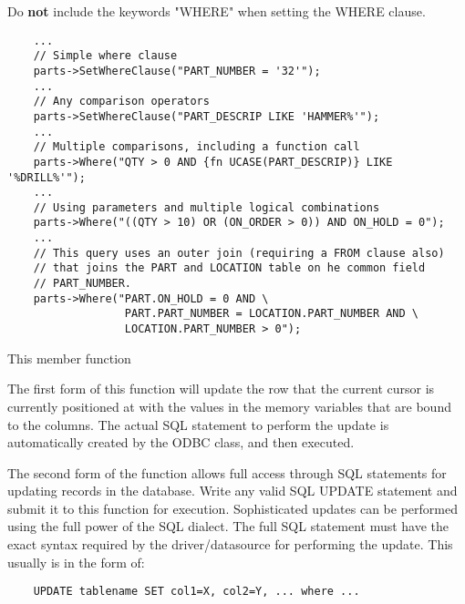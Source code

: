 Do {\bf not} include the keywords "WHERE" when setting the WHERE clause.


\begin{verbatim}
    ...
    // Simple where clause
    parts->SetWhereClause("PART_NUMBER = '32'");
    ...
    // Any comparison operators
    parts->SetWhereClause("PART_DESCRIP LIKE 'HAMMER%'");
    ...
    // Multiple comparisons, including a function call
    parts->Where("QTY > 0 AND {fn UCASE(PART_DESCRIP)} LIKE '%DRILL%'");
    ...
    // Using parameters and multiple logical combinations
    parts->Where("((QTY > 10) OR (ON_ORDER > 0)) AND ON_HOLD = 0");
    ...
    // This query uses an outer join (requiring a FROM clause also)
    // that joins the PART and LOCATION table on he common field
    // PART_NUMBER.
    parts->Where("PART.ON_HOLD = 0 AND \
                  PART.PART_NUMBER = LOCATION.PART_NUMBER AND \
                  LOCATION.PART_NUMBER > 0");
\end{verbatim}


\label{wxdbtableupdate}



This member function   

The first form of this function will update the row that the current cursor 
is currently positioned at with the values in the memory variables that 
are bound to the columns.  The actual SQL statement to perform the update 
is automatically created by the ODBC class, and then executed.

The second form of the function allows full access through SQL statements for 
updating records in the database.  Write any valid SQL UPDATE statement and 
submit it to this function for execution.  Sophisticated updates can be 
performed using the full power of the SQL dialect. The full SQL statement 
must have  the exact syntax required by the driver/datasource for performing 
the update.  This usually is in the form of:

\begin{verbatim}
    UPDATE tablename SET col1=X, col2=Y, ... where ...
\end{verbatim}



\wxheading{Remarks}

